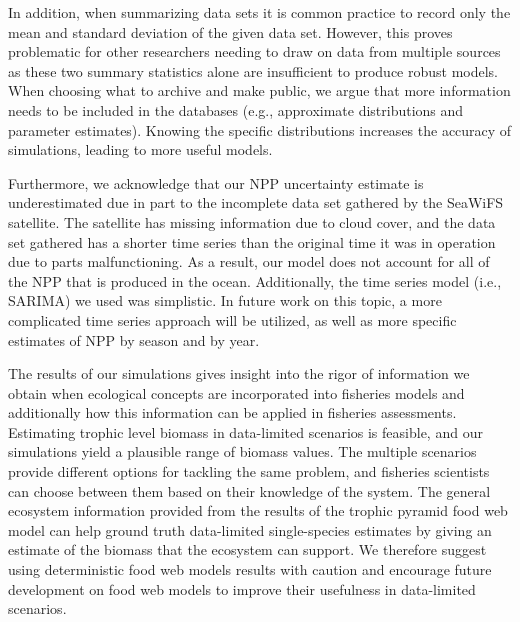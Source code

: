 \documentclass[oneside,12pt,final]{sty/ucthesis-CA2012}
\begin{document}
\begin{mainmatter}
\vspace{5mm}

In addition, when summarizing data sets it is common practice to record only the mean and standard deviation of the given data set. However, this proves problematic for other researchers needing to draw on data from multiple sources as these two summary statistics alone are insufficient to produce robust models. When choosing what to archive and make public, we argue that more information needs to be included in the databases (e.g., approximate distributions and parameter estimates). Knowing the specific distributions increases the accuracy of simulations, leading to more useful models.

\vspace{5mm}

Furthermore, we acknowledge that our NPP uncertainty estimate is underestimated due in part to the incomplete data set gathered by the SeaWiFS satellite. The satellite has missing information due to cloud cover, and the data set gathered has a shorter time series than the original time it was in operation due to parts malfunctioning. As a result, our model does not account for all of the NPP that is produced in the ocean. Additionally, the time series model (i.e., SARIMA) we used was simplistic. 
In future work on this topic, a more complicated time series approach will be utilized, as well as more specific estimates of NPP by season and by year.

\vspace{5mm}

The results of our simulations gives insight into the rigor of information we obtain when ecological concepts are incorporated into fisheries models and additionally how this information can be applied in fisheries assessments. Estimating trophic level biomass in data-limited scenarios is feasible, and our simulations yield a plausible range of biomass values. The multiple scenarios provide different options for tackling the same problem, and fisheries scientists can choose between them based on their knowledge of the system. The general ecosystem information provided from the results of the trophic pyramid food web model can help ground truth data-limited single-species estimates by giving an estimate of the biomass that the ecosystem can support. We therefore suggest using deterministic food web models results with caution and encourage future development on food web models to improve their usefulness in data-limited scenarios. 



\end{mainmatter}
\end{document}
